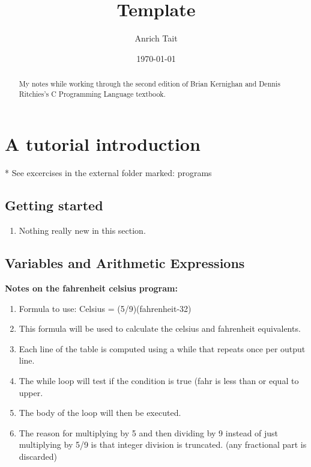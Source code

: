 \documentclass[12pt, letterpaper]{report}
\title{Template}
\author{Anrich Tait}
\date{\today}
\begin{document}
\restoregeometry %
\nopagecolor%

\begin{abstract}
	My notes while working through the second edition of Brian Kernighan and Dennis
	Ritchies's C Programming Language textbook.
\end{abstract}
\tableofcontents

\chapter{A tutorial introduction}
* See excercises in the external folder marked: programs

\section{Getting started}
\begin{enumerate}
	\item Nothing really new in this section.
\end{enumerate}

\section{Variables and Arithmetic Expressions}
\textbf{Notes on the fahrenheit celsius program:}
\begin{enumerate}
	\item Formula to use: Celsius = (5/9)(fahrenheit-32)
	\item This formula will be used to calculate the celsius and fahrenheit equivalents.
	\item Each line of the table is computed using a while that repeats once per output line.
	\item The while loop will test if the condition is true (fahr is less than or equal to upper.
	\item The body of the loop will then be executed.
	\item The reason for multiplying by 5 and then dividing by 9 instead of just multiplying by 5/9 is that integer division is truncated.
		(any fractional part is discarded)
\end{enumerate}
\end{document}
